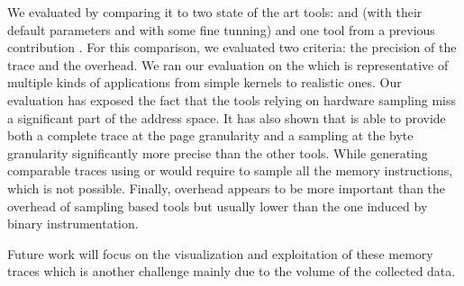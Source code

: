 We evaluated \Moca by comparing it to two state of the art tools: \Mitos and
\MemProf (with their default parameters and with some fine tunning) and one
tool from a previous contribution \TABARNAC. For this comparison, we evaluated
two criteria: the precision of the trace and the overhead. We ran our
evaluation on the \NPB which is representative of multiple kinds of applications from simple kernels
to realistic ones. Our evaluation has exposed the fact that the tools
relying on hardware sampling miss a significant part of the address space. It
has also shown that \Moca is able to provide both a complete trace at the page
granularity and a sampling at the byte granularity significantly more precise than the
other tools. While generating comparable traces using \MemProf or \Mitos would
require to sample all the memory instructions, which is not possible.
Finally, \Moca overhead appears to be more important than the overhead of sampling
based tools but usually lower than the one induced by binary instrumentation.

Future work will focus on the visualization and exploitation of these memory traces
which is another challenge mainly due to the volume of the collected data.
